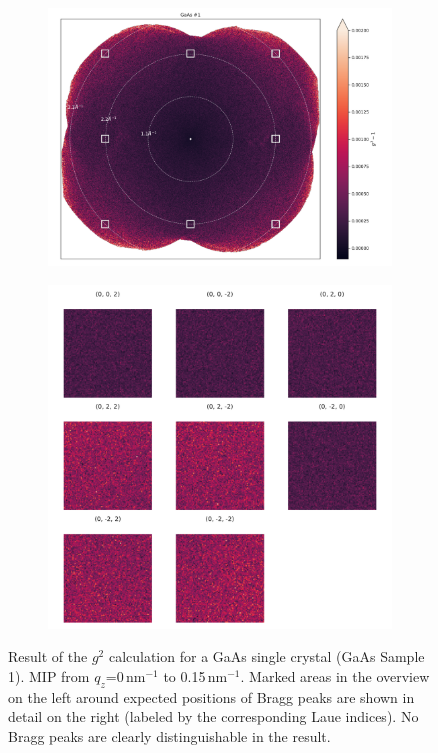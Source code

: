 \begin{figure}
	\centering
	\begin{subfigure}[b]{0.55\textwidth}
		\includegraphics[width=\linewidth]{images/gaas1_overview.pdf}
	\end{subfigure}
	\begin{subfigure}[b]{0.4\textwidth}
		\includegraphics[width=\linewidth]{images/gaas1_zoom.pdf}
	\end{subfigure}
	\caption[Results GaAs]{Result of the $g^2$ calculation for a GaAs single crystal (GaAs Sample 1). MIP from $q_z$=0\,nm$^{-1}$ to 0.15\,nm$^{-1}$. Marked areas in the overview on the left around expected positions of Bragg peaks are shown in detail on the right (labeled by the corresponding Laue indices). No Bragg peaks are  clearly distinguishable in the result.}
	\label{fig:resgaas1}
\end{figure}



